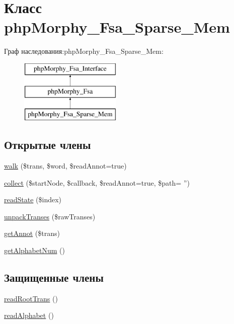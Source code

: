 \hypertarget{classphpMorphy__Fsa__Sparse__Mem}{
\section{Класс phpMorphy\_\-Fsa\_\-Sparse\_\-Mem}
\label{classphpMorphy__Fsa__Sparse__Mem}
}
Граф наследования:phpMorphy\_\-Fsa\_\-Sparse\_\-Mem:\begin{figure}[H]
\begin{center}
\leavevmode
\includegraphics[height=3.000000cm]{classphpMorphy__Fsa__Sparse__Mem}
\end{center}
\end{figure}
\subsection*{Открытые члены}
\begin{DoxyCompactItemize}
\item 
\hyperlink{classphpMorphy__Fsa__Sparse__Mem_a21d59e28eaf3ae4061d17d27c7beff71}{walk} (\$trans, \$word, \$readAnnot=true)
\item 
\hyperlink{classphpMorphy__Fsa__Sparse__Mem_a615b89a41b05ed4114bb1560d1c6efd2}{collect} (\$startNode, \$callback, \$readAnnot=true, \$path= '')
\item 
\hyperlink{classphpMorphy__Fsa__Sparse__Mem_a1847ff1d9e54a2d27714cdd8f433b092}{readState} (\$index)
\item 
\hyperlink{classphpMorphy__Fsa__Sparse__Mem_a2f3d9080c9f6d42261eb8bf10f5c6bf3}{unpackTranses} (\$rawTranses)
\item 
\hyperlink{classphpMorphy__Fsa__Sparse__Mem_a402b28c703c48271b990253e055e53a4}{getAnnot} (\$trans)
\item 
\hyperlink{classphpMorphy__Fsa__Sparse__Mem_a9290956d9e71d2f22bedff414bbfe924}{getAlphabetNum} ()
\end{DoxyCompactItemize}
\subsection*{Защищенные члены}
\begin{DoxyCompactItemize}
\item 
\hyperlink{classphpMorphy__Fsa__Sparse__Mem_a44a5d8ae2efb3abb08986eb1f20afbaa}{readRootTrans} ()
\item 
\hyperlink{classphpMorphy__Fsa__Sparse__Mem_aa59923ba3d8d5243237059967e650b51}{readAlphabet} ()
\end{DoxyCompactItemize}
